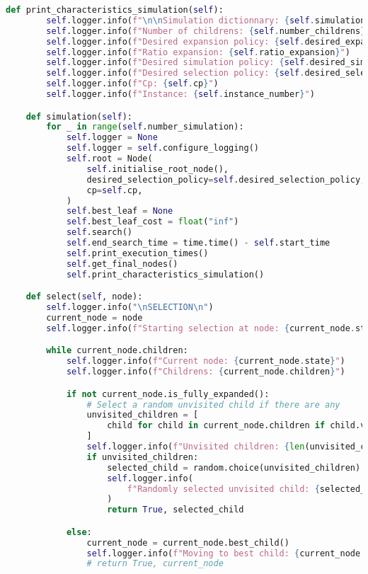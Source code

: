 \begin{lstlisting}[language = Python]
    def print_characteristics_simulation(self):
        self.logger.info(f"\n\nSimulation dictionnary: {self.simulations_dict}")
        self.logger.info(f"Number of childrens: {self.number_childrens}")
        self.logger.info(f"Desired expansion policy: {self.desired_expansion_policy}")
        self.logger.info(f"Ratio expansion: {self.ratio_expansion}")
        self.logger.info(f"Desired simulation policy: {self.desired_simulation_policy}")
        self.logger.info(f"Desired selection policy: {self.desired_selection_policy}")
        self.logger.info(f"Cp: {self.cp}")
        self.logger.info(f"Instance: {self.instance_number}")

    def simulation(self):
        for _ in range(self.number_simulation):
            self.logger = None
            self.logger = self.configure_logging()
            self.root = Node(
                self.initialise_root_node(),
                desired_selection_policy=self.desired_selection_policy,
                cp=self.cp,
            )
            self.best_leaf = None
            self.best_leaf_cost = float("inf")
            self.search()
            self.end_search_time = time.time() - self.start_time
            self.print_execution_times()
            self.get_final_nodes()
            self.print_characteristics_simulation()

    def select(self, node):
        self.logger.info("\nSELECTION\n")
        current_node = node
        self.logger.info(f"Starting selection at node: {current_node.state}")

        while current_node.children:
            self.logger.info(f"Current node: {current_node.state}")
            self.logger.info(f"Childrens: {current_node.children}")

            if not current_node.is_fully_expanded():
                # Select a random unvisited child if there are any
                unvisited_children = [
                    child for child in current_node.children if child.visit_count == 0
                ]
                self.logger.info(f"Unvisited children: {len(unvisited_children)}")
                if unvisited_children:
                    selected_child = random.choice(unvisited_children)
                    self.logger.info(
                        f"Randomly selected unvisited child: {selected_child}"
                    )
                    return True, selected_child

            else:
                current_node = current_node.best_child()
                self.logger.info(f"Moving to best child: {current_node.state}")
                # return True, current_node


\end{lstlisting}

